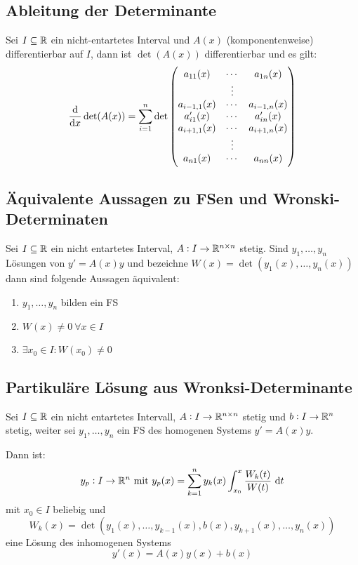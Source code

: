 \subsection{Ableitung der Determinante}
Sei $I \subseteq \mathbb{R}$ ein nicht-entartetes Interval und $A(x)$ (komponentenweise) differentierbar auf
$I$, dann ist $\det(A(x))$ differentierbar und es gilt:
\begin{equation*}
	\dfrac{\text{d}}{\text{d}x} \det(A(x)) = \sum_{i=1}^n \det \begin{pmatrix}
		a_{11}(x) & \cdots & a_{1n}(x)\\
		& \vdots \\
		a_{i-1,1}(x) & \cdots & a_{i-1,n}(x)\\
		a'_{i1}(x) & \cdots & a'_{in}(x)\\
		a_{i+1,1}(x) & \cdots & a_{i+1,n}(x)\\
		& \vdots \\
		a_{n1}(x) & \cdots & a_{nn}(x)\\
	\end{pmatrix}
\end{equation*}


\subsection{Äquivalente Aussagen zu FSen und Wronski-Determinaten}
Sei $I \subseteq \mathbb{R}$ ein nicht entartetes Interval, $A: I \to \mathbb{R}^{n \times n}$ stetig.
Sind $y_1, \ldots, y_n$ Lösungen von $y' = A(x)  y$ und bezeichne $W(x) = \det(y_1(x), \ldots, y_n(x))$
dann sind folgende Aussagen äquivalent:
\begin{enumerate}[label= (\alph*)]
	\item $y_1, \ldots, y_n$ bilden ein FS
	\item $W(x) \neq 0\ \forall x \in I$
	\item $\exists x_0 \in I: W(x_0) \neq 0$
\end{enumerate}		

\subsection{Partikuläre Lösung aus Wronksi-Determinante}
Sei $I \subseteq \mathbb{R}$ ein nicht entartetes Intervall, $A: I \to \mathbb{R}^{n \times n}$ stetig und $b: I \to \mathbb{R}^n$
stetig, weiter sei $y_1, \ldots, y_n$ ein FS des homogenen Systems $y' = A(x) y$.

Dann ist:
\begin{equation*}
	y_p: I \to \mathbb{R}^n \text{ mit } y_p(x) = \sum_{k=1}^n y_k(x) \int_{x_0}^x \frac{W_k(t)}{W(t)} \text{ d}t
\end{equation*}
mit $x_0 \in I$ beliebig und 
\begin{equation*}
	W_k(x) = \det(y_1(x), \ldots, y_{k-1}(x), b(x), y_{k+1}(x), \ldots, y_n(x))
\end{equation*}
eine Lösung des inhomogenen Systems
\begin{equation*}
	y'(x) = A(x) y(x) + b(x)
\end{equation*}